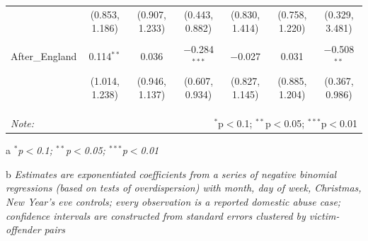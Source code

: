 \documentclass[12pt, a4paper]{article}
\begin{document}
\begin{table}
{\begin{threeparttable}
\begin{tabular}{@{\extracolsep{5pt}}lcccccc}
  & (0.853, 1.186) & (0.907, 1.233) & (0.443, 0.882) & (0.830, 1.414) & (0.758, 1.220) & (0.329, 3.481) \\ 
  & & & & & & \\ 
 After\_England & 0.114$^{**}$ & 0.036 & $-$0.284$^{***}$ & $-$0.027 & 0.031 & $-$0.508$^{**}$ \\ 
  & (1.014, 1.238) & (0.946, 1.137) & (0.607, 0.934) & (0.827, 1.145) & (0.885, 1.204) & (0.367, 0.986) \\ 
  & & & & & & \\ 
\hline \\[-1.8ex] 
\hline 
\hline \\[-1.8ex] 
\textit{Note:}  & \multicolumn{6}{r}{$^{*}$p$<$0.1; $^{**}$p$<$0.05; $^{***}$p$<$0.01} \\ 
\end{tabular} 
\begin{tablenotes}
      \item[a] \textit{$^{*}$p$<$0.1; $^{**}$p$<$0.05; $^{***}$p$<$0.01}
      \item[b] \textit{Estimates are exponentiated coefficients from a series of negative binomial regressions (based on tests of overdispersion) with month, day of week, Christmas, New Year's eve controls; every observation is a reported domestic abuse case; confidence intervals are constructed from standard errors clustered by victim-offender pairs}
    \end{tablenotes}
\end{threeparttable}   }
\end{table}
\end{document}
